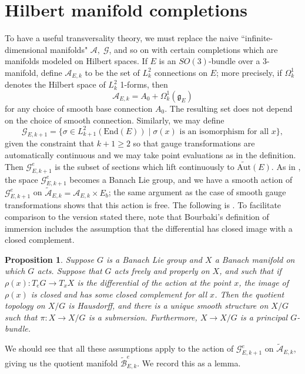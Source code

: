 \documentclass[10pt,a4paper]{amsart}
\newtheorem{proposition}[theorem]{Proposition}
\theoremstyle{definition}
\theoremstyle{remark}
\numberwithin{figure}{qchap}
\begin{document}
\section{Hilbert manifold completions}\label{sec:config-Hilbert-3d}
To have a useful transversality theory, we must replace the naive ``infinite-dimensional manifolds" $\mathcal A,\; \mathcal G$, and so on with certain completions which are manifolds modeled on Hilbert spaces. If $E$ is an $SO(3)$-bundle over a 3-manifold, define $\mathcal A_{E,k}$ to be the set of $L^2_k$ connections on $E$; more precisely, if $\Omega^1_k$ denotes the Hilbert space of $L^2_k$ 1-forms, then 
$$\mathcal A_{E,k} = A_0 + \Omega^1_k(\mathfrak g_E)$$
for any choice of smooth base connection $A_0$. The resulting set does not depend on the choice of smooth connection. Similarly, we may define 
$$\mathcal G_{E,k+1} = \{\sigma \in L^2_{k+1}(\text{End}(E)) \mid \sigma(x) \text{ is an isomorphism for all } x\},$$ 
given the constraint that $k+1 \geq 2$ so that gauge transformations are automatically continuous and we may take point evaluations as in the definition. Then $\mathcal G^e_{E,k+1}$ is the subset of sections which lift continuously to $\widetilde{\text{Aut}}(E)$. As in \cite[Section~4.2]{DK}, the space $\mathcal G^e_{E,k+1}$ becomes a Banach Lie group, and we have a smooth action of $\mathcal G^{e}_{E,k+1}$ on $\widetilde{\mathcal A}_{E,k} = \mathcal A_{E,k} \times E_b$; the same argument as the case of smooth gauge transformations shows that this action is free. The following is \cite[Proposition~3.1.5.10]{Bou}. To facilitate comparison to the version stated there, note that Bourbaki's definition of immersion includes the assumption that the differential has closed image with a closed complement.

\begin{proposition}Suppose $G$ is a Banach Lie group and $X$ a Banach manifold on which $G$ acts. Suppose that $G$ acts freely and properly on $X$, and such that if $\rho(x): T_eG \to T_xX$ is the differential of the action at the point $x$, the image of $\rho(x)$ is closed and has some closed complement for all $x$. Then the quotient topology on $X/G$ is Hausdorff, and there is a unique smooth structure on $X/G$ such that $\pi: X \to X/G$ is a submersion. Furthermore, $X \to X/G$ is a principal $G$-bundle.
\end{proposition}

We should see that all these assumptions apply to the action of $\mathcal G^e_{E,k+1}$ on $\widetilde{\mathcal A}_{E,k}$, giving us the quotient manifold $\widetilde{\mathcal B}^e_{E,k}$. We record this as a lemma.
\end{document}
